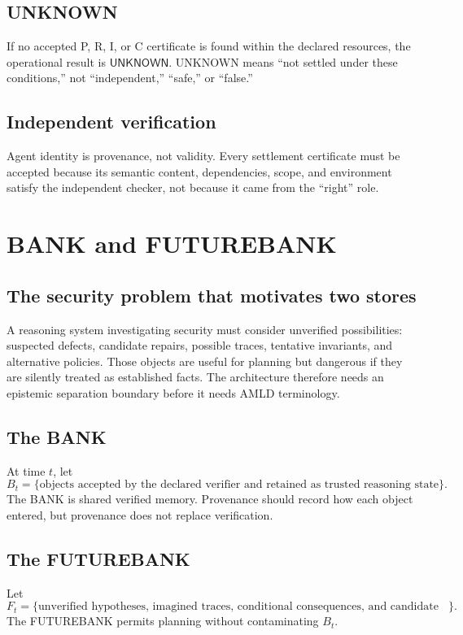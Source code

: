 \documentclass[11pt,oneside]{book}
\theoremstyle{definition}
\theoremstyle{remark}
\newcommand{\UNKNOWN}{\mathsf{UNKNOWN}}
\begin{document}
\section{UNKNOWN}
\label{sec:unknown}
If no accepted P, R, I, or C certificate is found within the declared resources, the operational result is $\UNKNOWN$. UNKNOWN means ``not settled under these conditions,'' not ``independent,'' ``safe,'' or ``false.''

\section{Independent verification}
Agent identity is provenance, not validity. Every settlement certificate must be accepted because its semantic content, dependencies, scope, and environment satisfy the independent checker, not because it came from the ``right'' role.

\chapter{BANK and FUTUREBANK}
\label{ch:bank}
\section{The security problem that motivates two stores}
A reasoning system investigating security must consider unverified possibilities: suspected defects, candidate repairs, possible traces, tentative invariants, and alternative policies. Those objects are useful for planning but dangerous if they are silently treated as established facts. The architecture therefore needs an epistemic separation boundary before it needs AMLD terminology.

\section{The BANK}
\label{sec:bank-definition}
At time $t$, let
\[
B_t=\{\text{objects accepted by the declared verifier and retained as trusted reasoning state}\}.
\]
The BANK is shared verified memory. Provenance should record how each object entered, but provenance does not replace verification.

\section{The FUTUREBANK}
\label{sec:futurebank-definition}
Let
\[
F_t=\{\text{unverified hypotheses, imagined traces, conditional consequences, and candidate repairs}\}.
\]
The FUTUREBANK permits planning without contaminating $B_t$.
\end{document}
